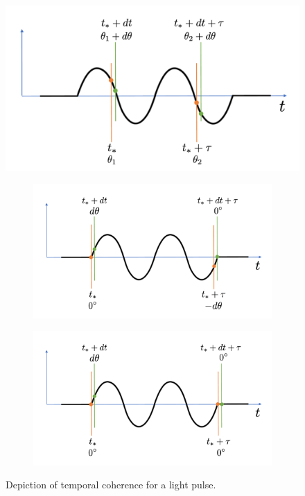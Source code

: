 \documentclass[a4paper,11pt]{report}
\begin{document}
\begin{figure}
    \centering
    \includegraphics[width=.7\textwidth]{../../images/temp_cohe_1.pdf}
    \caption{}
    \label{fig:laser_temp_cohe}
\end{figure}

\begin{figure}
    \centering
    \begin{subfigure}{.7\textwidth}
      \centering
      \includegraphics[width=\textwidth]{../../images/temp_cohe_2.pdf}
      \caption{}
      \label{fig:laser_temp_cohe_1}
    \end{subfigure}
    \begin{subfigure}{.7\textwidth}
        \centering
        \includegraphics[width=\textwidth]{../../images/temp_cohe_3.pdf}
        \caption{}
        \label{fig:laser_temp_cohe_2}
      \end{subfigure}
    \caption{Depiction of temporal coherence for a light pulse.}
    \label{fig:laser_temp_cohe_12}
\end{figure}
\end{document}
